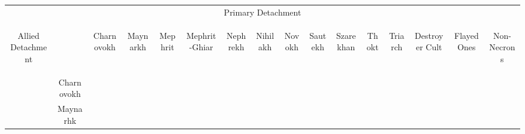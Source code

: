 
\begin{tabular}{||c c c c c c c c c c c c c c c c||}
	\hline
	\multicolumn{16}{||c||}{Primary Detachment} \\
	\multirow{15}{*}{\begin{sideways}Allied Detachment\end{sideways}} & & \begin{sideways}Charnovokh \end{sideways} & \begin{sideways}Maynarkh \end{sideways} & \begin{sideways}Mephrit \end{sideways} & \begin{sideways}Mephrit-Ghiar \end{sideways} & \begin{sideways}Nephrekh \end{sideways} & \begin{sideways}Nihilakh \end{sideways} & \begin{sideways}Novokh \end{sideways} & \begin{sideways}Sautekh \end{sideways} & \begin{sideways}Szarekhan \end{sideways} & \begin{sideways}Thokt \end{sideways} & \begin{sideways}Triarch \end{sideways} & \begin{sideways}Destroyer Cult \end{sideways} & \begin{sideways}Flayed Ones \end{sideways} & \begin{sideways}Non-Necrons \end{sideways}\\
	& Charnovokh & & \greyskull & \blackskull & \blackskull & \blackskull & \blackskull & \blackskull & \blackskull & \redskull & \blackskull & \blackskull & \greyskull & \redskull & \redskull \\
	& Maynarhk & \greyskull & & \blackskull & \blackskull & \greyskull & \greyskull & \blackskull & \greyskull & \blackskull & \greyskull & \blackskull & \blackskull & \greyskull & \redskull \\

\end{tabular}
